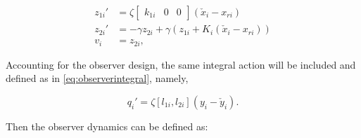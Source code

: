 \documentclass[main.tex]{subfiles}
\begin{document}
		\begin{align}
		z_{1i}' &= \zeta \begin{bmatrix} 
		k_{1i} & 0 & 0
		\end{bmatrix}(\check{x}_i - x_{ri}) \\
		z_{2i}' &= -\gamma z_{2i}  + \gamma (z_{1i} + K_i(\check{x}_i - x_{ri})) \\
		v_i &= z_{2i},
		\end{align}

Accounting for the observer design, the same integral action will be included and defined as in \eqref{eq:observerintegral}, namely,

	\begin{equation}
	q_i' = \zeta[l_{1i},l_{2i}](y_i - \check{y}_i). \label{eq:observerintegral2} \nonumber
	\end{equation} 
	 
Then the observer dynamics can be defined as:
\end{document}
